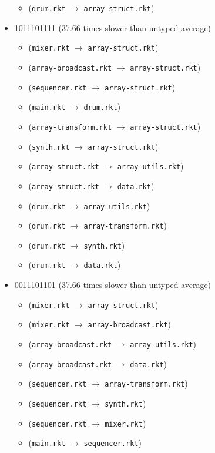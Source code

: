 \documentclass{article}
\newcommand{\mono}[1]{\texttt{#1}}
\begin{document}
\begin{itemize}
\begin{itemize}
  \item (\mono{drum.rkt} $\rightarrow$ \mono{array-struct.rkt})
  \end{itemize}
\item 1011101111 (37.66 times slower than untyped average)
  \begin{itemize}
  \item (\mono{mixer.rkt} $\rightarrow$ \mono{array-struct.rkt})
  \item (\mono{array-broadcast.rkt} $\rightarrow$ \mono{array-struct.rkt})
  \item (\mono{sequencer.rkt} $\rightarrow$ \mono{array-struct.rkt})
  \item (\mono{main.rkt} $\rightarrow$ \mono{drum.rkt})
  \item (\mono{array-transform.rkt} $\rightarrow$ \mono{array-struct.rkt})
  \item (\mono{synth.rkt} $\rightarrow$ \mono{array-struct.rkt})
  \item (\mono{array-struct.rkt} $\rightarrow$ \mono{array-utils.rkt})
  \item (\mono{array-struct.rkt} $\rightarrow$ \mono{data.rkt})
  \item (\mono{drum.rkt} $\rightarrow$ \mono{array-utils.rkt})
  \item (\mono{drum.rkt} $\rightarrow$ \mono{array-transform.rkt})
  \item (\mono{drum.rkt} $\rightarrow$ \mono{synth.rkt})
  \item (\mono{drum.rkt} $\rightarrow$ \mono{data.rkt})
  \end{itemize}
\item 0011101101 (37.66 times slower than untyped average)
  \begin{itemize}
  \item (\mono{mixer.rkt} $\rightarrow$ \mono{array-struct.rkt})
  \item (\mono{mixer.rkt} $\rightarrow$ \mono{array-broadcast.rkt})
  \item (\mono{array-broadcast.rkt} $\rightarrow$ \mono{array-utils.rkt})
  \item (\mono{array-broadcast.rkt} $\rightarrow$ \mono{data.rkt})
  \item (\mono{sequencer.rkt} $\rightarrow$ \mono{array-transform.rkt})
  \item (\mono{sequencer.rkt} $\rightarrow$ \mono{synth.rkt})
  \item (\mono{sequencer.rkt} $\rightarrow$ \mono{mixer.rkt})
  \item (\mono{main.rkt} $\rightarrow$ \mono{sequencer.rkt})

\end{itemize}
\end{itemize}
\end{document}
